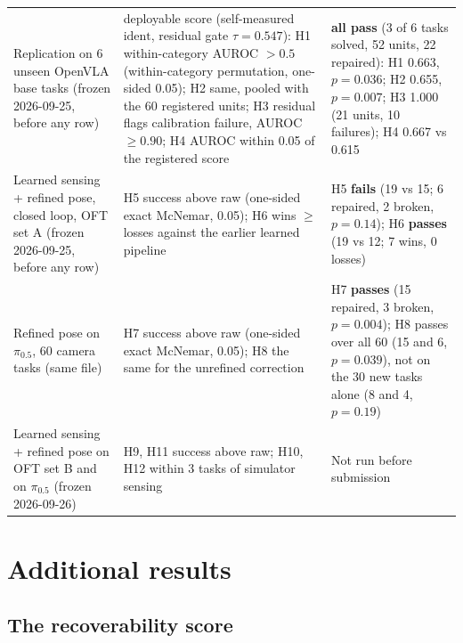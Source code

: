 \documentclass{article}
\newcommand{\ident}{\mathrm{ident}}
\newcommand{\pihalf}{$\pi_{0.5}$}
\begin{document}
\begin{table}[!ht]
{\begin{tabular}{p{3.6cm}p{5.2cm}p{5.6cm}}
Replication on 6 unseen OpenVLA base tasks (frozen 2026-09-25, before any row) & deployable
score (self-measured $\ident$, residual gate $\tau = 0.547$): H1 within-category AUROC $> 0.5$ (within-category
permutation, one-sided 0.05); H2 same, pooled with the 60 registered units; H3 residual flags calibration failure,
AUROC $\ge 0.90$; H4 AUROC within 0.05 of the registered score & \textbf{all pass} (3 of 6 tasks solved, 52 units,
22 repaired): H1 0.663, $p = 0.036$; H2 0.655, $p = 0.007$; H3 1.000 (21 units, 10 failures); H4 0.667 vs 0.615 \\
Learned sensing + refined pose, closed loop, OFT set A (frozen 2026-09-25, before any row) & H5 success above raw
(one-sided exact McNemar, 0.05); H6 wins $\ge$ losses against the earlier learned pipeline & H5 \textbf{fails} (19 vs
15; 6 repaired, 2 broken, $p = 0.14$); H6 \textbf{passes} (19 vs 12; 7 wins, 0 losses) \\
Refined pose on \pihalf, 60 camera tasks (same file) & H7 success above raw (one-sided exact McNemar, 0.05); H8 the
same for the unrefined correction & H7 \textbf{passes} (15 repaired, 3 broken, $p = 0.004$); H8 passes over all 60 (15
and 6, $p = 0.039$), not on the 30 new tasks alone (8 and 4, $p = 0.19$) \\
Learned sensing + refined pose on OFT set B and on \pihalf{} (frozen 2026-09-26) & H9, H11
success above raw; H10, H12 within 3 tasks of simulator sensing & Not run before submission \\
\bottomrule
\end{tabular}}
\end{table}

\FloatBarrier
\section{Additional results}
\label{app:extra}

\subsection{The recoverability score}
\end{document}
